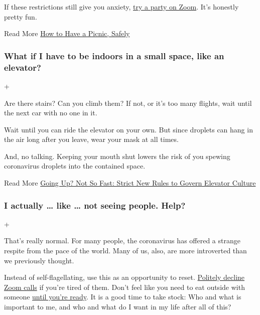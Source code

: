 If these restrictions still give you anxiety,
\href{https://www.nytimes3xbfgragh.onion/2020/05/02/smarter-living/zoom-birthday-party.html}{try
a party on Zoom}. It's honestly pretty fun.

Read More
\href{https://www.nytimes3xbfgragh.onion/2020/05/09/dining/coronavirus-how-to-have-a-picnic-safely.html}{How
to Have a Picnic, Safely}

\hypertarget{what-if-i-have-to-be-indoors-in-a-small-space-like-an-elevator}{%
\subsubsection{What if I have to be indoors in a small space, like an
elevator?}\label{what-if-i-have-to-be-indoors-in-a-small-space-like-an-elevator}}

+

Are there stairs? Can you climb them? If not, or it's too many flights,
wait until the next car with no one in it.

Wait until you can ride the elevator on your own. But since droplets can
hang in the air long after you leave, wear your mask at all times.

And, no talking. Keeping your mouth shut lowers the risk of you spewing
coronavirus droplets into the contained space.

Read More
\href{https://www.nytimes3xbfgragh.onion/2020/06/26/health/coronavirus-elevator-reopen.html}{Going
Up? Not So Fast: Strict New Rules to Govern Elevator Culture}

\hypertarget{i-actually--like--not-seeing-people-help}{%
\subsubsection{I actually \ldots{} like \ldots{} not seeing people.
Help?}\label{i-actually--like--not-seeing-people-help}}

+

That's really normal. For many people, the coronavirus has offered a
strange respite from the pace of the world. Many of us, also, are more
introverted than we previously thought.

Instead of self-flagellating, use this as an opportunity to reset.
\href{https://www.nytimes3xbfgragh.onion/2020/05/20/smarter-living/coronavirus-zoom-facetime-fatigue.html}{Politely
decline Zoom calls} if you're tired of them. Don't feel like you need to
eat outside with someone
\href{https://www.nytimes3xbfgragh.onion/2020/07/09/style/coronavirus-backyard-entertaining.html}{until
you're ready}. It is a good time to take stock: Who and what is
important to me, and who and what do I want in my life after all of
this?

